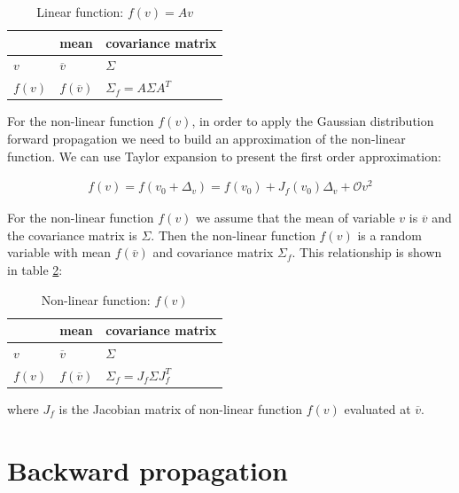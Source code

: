 \begin{table}[h!]
\begin{center}
\begin{tabular}{ |l|l|l| }
\hline
 & mean & covariance matrix \\ \hline
$v$ & $\overline{v}$  & $\Sigma$ \\
$f(v)$ & $f(\overline{v})$ & $\Sigma_f = A \Sigma A^T$ \\
\hline
\end{tabular}
\caption[Table caption text]{Linear function: $f(v) = Av $}
\label{table:linear_function}
\end{center}
\end{table}

For the non-linear function $f(v)$, in order to apply the Gaussian distribution forward propagation we need to build an approximation of the non-linear function. We can use Taylor expansion to  present the first order approximation:

\begin{align*}
f(v) = f(v_0 + \Delta_v) = f(v_0) + J_f(v_0)\Delta_v + \mathcal{O}{v^2}
\end{align*}

For the non-linear function $f(v)$ we assume that the mean of variable $\textit{v}$ is $\overline{v}$ and the covariance matrix is $\Sigma$. Then the non-linear function $f(v)$ is a random variable with mean $f(\overline{v})$ and covariance matrix $\Sigma_f$. This relationship is shown in table \ref{table:nonlinear_function}:

\begin{table}[h!]
\begin{center}
\begin{tabular}{ |l|l|l| }
\hline
 & mean & covariance matrix \\ \hline
$v$ & $\overline{v}$  & $\Sigma$ \\
$f(v)$ & $f(\overline{v})$ & $\Sigma_f = J_f \Sigma J_f^T$ \\
\hline
\end{tabular}
\caption[Table caption text]{Non-linear function: $f(v)$}
\label{table:nonlinear_function}
\end{center}
\end{table}

where $J_f$ is the Jacobian matrix of non-linear function $f(v)$ evaluated at $\overline{v}$.

\section{Backward propagation} 

